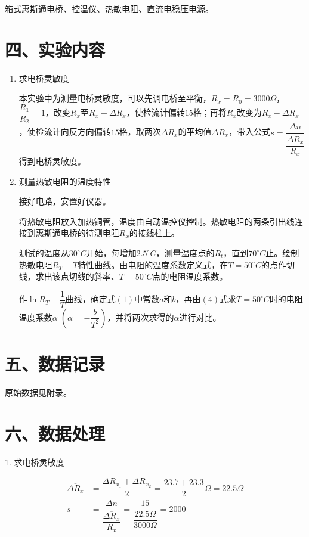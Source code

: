 \documentclass[11pt]{article}
\begin{document}
箱式惠斯通电桥、控温仪、热敏电阻、直流电稳压电源。

\section*{四、实验内容}

\begin{enumerate}
    \item 求电桥灵敏度
    
    本实验中为测量电桥灵敏度，可以先调电桥至平衡，$R_x=R_0=3000\Omega$，$\dfrac{R_1}{R_2}=1$，改变$R_x$至$R_x+\Delta R_x$，使检流计偏转$15$格；再将$R_x$改变为$R_x-\Delta R_x$，使检流计向反方向偏转$15$格，取两次$\Delta R_x$的平均值$\overline{\Delta R_x}$，带入公式$s=\dfrac{\Delta n}{\dfrac{\overline{\Delta R_x}}{R_x}}$得到电桥灵敏度。
    \item 测量热敏电阻的温度特性
    
    接好电路，安置好仪器。

    将热敏电阻放入加热铜管，温度由自动温控仪控制。热敏电阻的两条引出线连接到惠斯通电桥的待测电阻$R_x$的接线柱上。

    测试的温度从$30^{\circ}C$开始，每增加$2.5^{\circ}C$，测量温度点的$R_t$，直到$70^{\circ}C$止。绘制热敏电阻$R_T-T$特性曲线。由电阻的温度系数定义式，在$T=50^{\circ}C$的点作切线，求出该点切线的斜率、$T=50^{\circ}C$点的电阻温度系数。

    作$\ln R_T-\dfrac{1}{T}$曲线，确定式$(1)$中常数$a$和$b$，再由$(4)$式求$T=50^{\circ}C$时的电阻温度系数$\alpha\;(\alpha=-\dfrac{b}{T^2})$，并将两次求得的$\alpha$进行对比。
\end{enumerate}

\section*{五、数据记录}

原始数据见附录。

\section*{六、数据处理}

1. 求电桥灵敏度

\begin{align*}
    \overline{\Delta R_x}&=\dfrac{\Delta R_{x_1}+\Delta R_{x_2}}{2}=\dfrac{23.7+23.3}{2}\Omega=22.5\Omega \\
    s&=\dfrac{\Delta n}{\dfrac{\overline{\Delta R_x}}{R_x}}=\dfrac{15}{\dfrac{22.5\Omega}{3000\Omega}}=2000
\end{align*}
\end{document}

